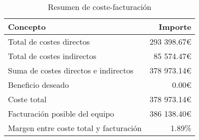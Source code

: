 \begin{table}[H]
    \centering
    \begin{tabular}{l r}
        \hline
        Concepto & Importe \\
        \hline
        Total de costes directos & 293 398.67€  \\
        Total de costes indirectos & 85 574.47€  \\
        Suma de costes directos e indirectos & 378 973.14€ \\
        Beneficio deseado & 0.00€ \\
        Coste total & 378 973.14€ \\
        Facturación posible del equipo & 386 138.40€ \\
        Margen entre coste total y facturación & 1.89\% \\
        \hline
    \end{tabular}
    \caption{Resumen de coste-facturación}
    \label{pre:resumen_empresa}
\end{table}